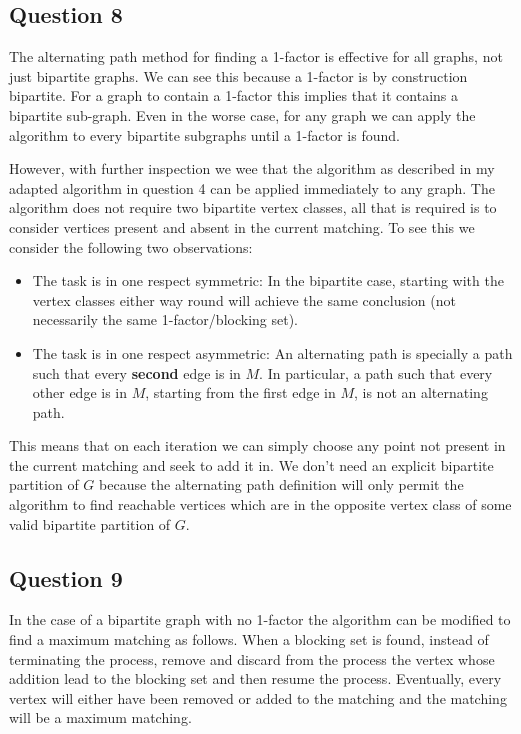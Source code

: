 \documentclass[a4paper]{article}
\begin{document}
\subsection*{Question 8}

The alternating path method for finding a 1-factor is effective for all graphs, not just bipartite graphs. We can see this because a 1-factor is by construction bipartite. For a graph to contain a 1-factor this implies that it contains a bipartite sub-graph. Even in the worse case, for any graph we can apply the algorithm to every bipartite subgraphs until a 1-factor is found.

\bigskip
However, with further inspection we wee that the algorithm as described in my adapted algorithm in question 4 can be applied immediately to any graph. The algorithm does not require two bipartite vertex classes, all that is required is to consider vertices present and absent in the current matching. To see this we consider the following two observations:
\begin{itemize}
    \item 
    The task is in one respect symmetric: In the bipartite case, starting with the vertex classes either way round will achieve the same conclusion (not necessarily the same 1-factor/blocking set).
    \item
    The task is in one respect asymmetric: An alternating path is specially a path such that every \textbf{second} edge is in $M$. In particular, a path such that every other edge is in $M$, starting from the first edge in $M$, is not an alternating path.
\end{itemize}
This means that on each iteration we can simply choose any point not present in the current matching and seek to add it in. We don't need an explicit bipartite partition of $G$ because the alternating path definition will only permit the algorithm to find reachable vertices which are in the opposite vertex class of some valid bipartite partition of $G$.

\subsection*{Question 9}

In the case of a bipartite graph with no 1-factor the algorithm can be modified to find a maximum matching as follows. When a blocking set is found, instead of terminating the process, remove and discard from the process the vertex whose addition lead to the blocking set and then resume the process. Eventually, every vertex will either have been removed or added to the matching and the matching will be a maximum matching.
\end{document}
